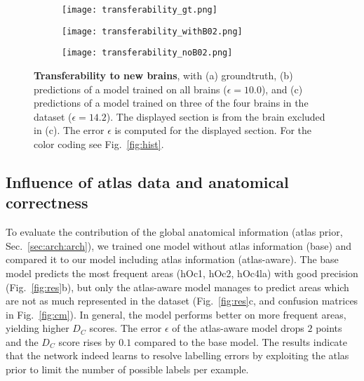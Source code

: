 \documentclass{article}
\begin{document}
\begin{figure}[t!]
	\centering
	\begin{subfigure}{.32\columnwidth}
		\centering
		\texttt{[image: transferability\_gt.png]}
	\end{subfigure}%
	\begin{subfigure}{.32\columnwidth}
		\centering
		\texttt{[image: transferability\_withB02.png]}
	\end{subfigure}%
	\begin{subfigure}{.32\columnwidth}
		\centering
		\texttt{[image: transferability\_noB02.png]}
	\end{subfigure}%
	\caption{
		\textbf{Transferability to new brains},
		with (a) groundtruth,
		(b) predictions of a model trained on all brains ($\epsilon=10.0$),
		and (c) predictions of a model trained on three of the four brains in the dataset ($\epsilon=14.2$).
		The displayed section is from the brain excluded in (c).
		The error $\epsilon$ is computed for the displayed section.
		For the color coding see Fig.~\ref{fig:hist}.
	}
	\label{fig:transfer}
\end{figure}

\vspace*{-.5\baselineskip}
\subsection{Influence of atlas data and anatomical correctness}
\label{sec:res:correct}
\vspace*{-.5\baselineskip}

To evaluate the contribution of the global anatomical information (atlas prior, Sec.~\ref{sec:arch:arch}), we trained one model without atlas information (base) and compared it to our model including atlas information (atlas-aware).
The base model predicts the most frequent areas (hOc1, hOc2, hOc4la) with good precision (Fig.~\ref{fig:res}b), but only the atlas-aware model manages to predict areas which are not as much represented in the dataset (Fig.~\ref{fig:res}c, and confusion matrices in Fig.~\ref{fig:cm}).
In general, the model performs better on more frequent areas, yielding higher $D_C$ scores.
The error $\epsilon$ of the atlas-aware model drops $2$ points and the $D_C$ score rises by $0.1$ compared to the base model.
The results indicate that the network indeed learns to resolve labelling errors by exploiting the atlas prior to limit the number of possible labels per example.
\end{document}

